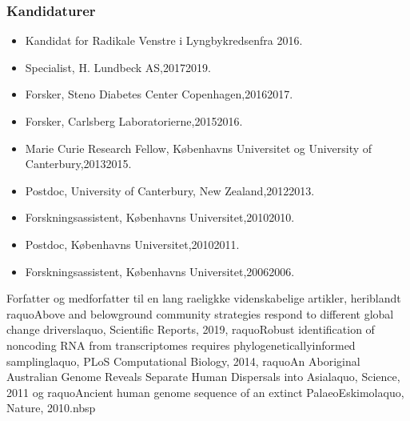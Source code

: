 \documentclass[11pt, a4paper]{awesome-cv}
\begin{document}
\begin{cvletter}
\subsubsection*{Kandidaturer}
\begin{itemize}
\item Kandidat for Radikale Venstre i Lyngbykredsenfra 2016.
\end{itemize}
\begin{itemize}
\item Specialist, H. Lundbeck AS,20172019.
\item Forsker, Steno Diabetes Center Copenhagen,20162017.
\item Forsker, Carlsberg Laboratorierne,20152016.
\item Marie Curie Research Fellow, Københavns Universitet og University of Canterbury,20132015.
\item Postdoc, University of Canterbury, New Zealand,20122013.
\item Forskningsassistent, Københavns Universitet,20102010.
\item Postdoc, Københavns Universitet,20102011.
\item Forskningsassistent, Københavns Universitet,20062006.
\end{itemize}
Forfatter og medforfatter til en lang raeligkke videnskabelige artikler, heriblandt raquoAbove and belowground community strategies respond to different global change driverslaquo, Scientific Reports, 2019, raquoRobust identification of noncoding RNA from transcriptomes requires phylogeneticallyinformed samplinglaquo, PLoS Computational Biology, 2014, raquoAn Aboriginal Australian Genome Reveals Separate Human Dispersals into Asialaquo, Science, 2011 og raquoAncient human genome sequence of an extinct PalaeoEskimolaquo, Nature, 2010.nbsp

\end{cvletter}
\end{document}
